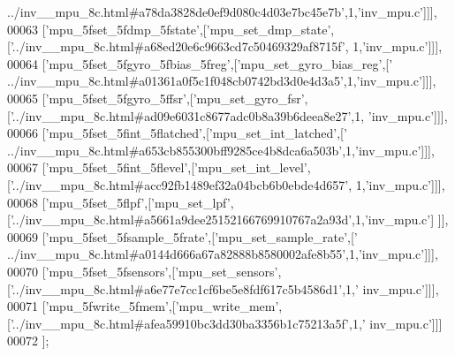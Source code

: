 \begin{DoxyCode}
{      ../inv\_\_mpu\_8c.html#a78da3828de0ef9d080c4d03e7bc45e7b'},1,\textcolor{stringliteral}{'inv\_mpu.c'}]]],
00063   [\textcolor{stringliteral}{'mpu\_5fset\_5fdmp\_5fstate'},[\textcolor{stringliteral}{'mpu\_set\_dmp\_state'},[\textcolor{stringliteral}{'../inv\_\_mpu\_8c.html#a68ed20e6c9663cd7c50469329af8715f'},
      1,\textcolor{stringliteral}{'inv\_mpu.c'}]]],
00064   [\textcolor{stringliteral}{'mpu\_5fset\_5fgyro\_5fbias\_5freg'},[\textcolor{stringliteral}{'mpu\_set\_gyro\_bias\_reg'},[\textcolor{stringliteral}{'
      ../inv\_\_mpu\_8c.html#a01361a0f5c1f048cb0742bd3d0e4d3a5'},1,\textcolor{stringliteral}{'inv\_mpu.c'}]]],
00065   [\textcolor{stringliteral}{'mpu\_5fset\_5fgyro\_5ffsr'},[\textcolor{stringliteral}{'mpu\_set\_gyro\_fsr'},[\textcolor{stringliteral}{'../inv\_\_mpu\_8c.html#ad09e6031c8677adc0b8a39b6deea8e27'},1,\textcolor{stringliteral}{
      'inv\_mpu.c'}]]],
00066   [\textcolor{stringliteral}{'mpu\_5fset\_5fint\_5flatched'},[\textcolor{stringliteral}{'mpu\_set\_int\_latched'},[\textcolor{stringliteral}{'
      ../inv\_\_mpu\_8c.html#a653cb855300bff9285ce4b8dca6a503b'},1,\textcolor{stringliteral}{'inv\_mpu.c'}]]],
00067   [\textcolor{stringliteral}{'mpu\_5fset\_5fint\_5flevel'},[\textcolor{stringliteral}{'mpu\_set\_int\_level'},[\textcolor{stringliteral}{'../inv\_\_mpu\_8c.html#acc92fb1489ef32a04bcb6b0ebde4d657'},
      1,\textcolor{stringliteral}{'inv\_mpu.c'}]]],
00068   [\textcolor{stringliteral}{'mpu\_5fset\_5flpf'},[\textcolor{stringliteral}{'mpu\_set\_lpf'},[\textcolor{stringliteral}{'../inv\_\_mpu\_8c.html#a5661a9dee25152166769910767a2a93d'},1,\textcolor{stringliteral}{'inv\_mpu.c'}]
      ]],
00069   [\textcolor{stringliteral}{'mpu\_5fset\_5fsample\_5frate'},[\textcolor{stringliteral}{'mpu\_set\_sample\_rate'},[\textcolor{stringliteral}{'
      ../inv\_\_mpu\_8c.html#a0144d666a67a82888b8580002afe8b55'},1,\textcolor{stringliteral}{'inv\_mpu.c'}]]],
00070   [\textcolor{stringliteral}{'mpu\_5fset\_5fsensors'},[\textcolor{stringliteral}{'mpu\_set\_sensors'},[\textcolor{stringliteral}{'../inv\_\_mpu\_8c.html#a6e77e7cc1cf6be5e8fdf617c5b4586d1'},1,\textcolor{stringliteral}{'
      inv\_mpu.c'}]]],
00071   [\textcolor{stringliteral}{'mpu\_5fwrite\_5fmem'},[\textcolor{stringliteral}{'mpu\_write\_mem'},[\textcolor{stringliteral}{'../inv\_\_mpu\_8c.html#afea59910bc3dd30ba3356b1c75213a5f'},1,\textcolor{stringliteral}{'
      inv\_mpu.c'}]]]
00072 ];
\end{DoxyCode}
